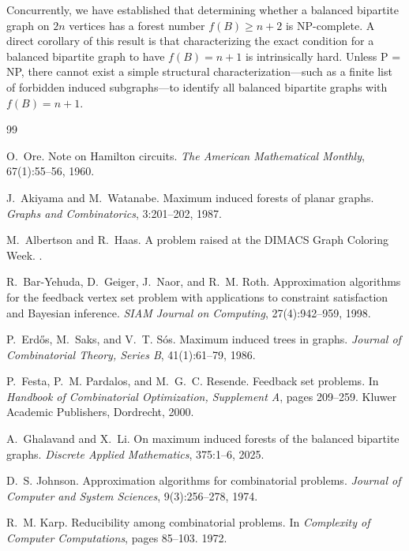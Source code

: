 \documentclass[a4paper]{amsart}
\begin{document}
Concurrently, we have established that determining whether a balanced bipartite graph on $2n$ vertices has a forest number $f(B) \ge n+2$ is NP-complete. 
A direct corollary of this result is that characterizing the exact condition for a balanced bipartite graph to have $f(B) = n+1$ is intrinsically hard. Unless P = NP, there cannot exist a simple structural characterization---such as a finite list of forbidden induced subgraphs---to identify all balanced bipartite graphs with $f(B) = n+1$.

\begin{thebibliography}{99}

O.~Ore.
\newblock Note on {H}amilton circuits.
\newblock \emph{The American Mathematical Monthly}, 67(1):55--56, 1960.

J.~Akiyama and M.~Watanabe.
\newblock Maximum induced forests of planar graphs.
\newblock \emph{Graphs and Combinatorics}, 3:201--202, 1987.

M.~Albertson and R.~Haas.
\newblock A problem raised at the {DIMACS} Graph Coloring Week.
.

R.~Bar-Yehuda, D.~Geiger, J.~Naor, and R.~M. Roth.
\newblock Approximation algorithms for the feedback vertex set problem with applications to constraint satisfaction and {B}ayesian inference.
\newblock \emph{SIAM Journal on Computing}, 27(4):942--959, 1998.

P.~Erd{\H{o}}s, M.~Saks, and V.~T. S{\'o}s.
\newblock Maximum induced trees in graphs.
\newblock \emph{Journal of Combinatorial Theory, Series B}, 41(1):61--79, 1986.

P.~Festa, P.~M. Pardalos, and M.~G.~C. Resende.
\newblock Feedback set problems.
\newblock In \emph{Handbook of Combinatorial Optimization, Supplement A}, pages 209--259. Kluwer Academic Publishers, Dordrecht, 2000.

A.~Ghalavand and X.~Li.
\newblock On maximum induced forests of the balanced bipartite graphs.
\newblock \emph{Discrete Applied Mathematics}, 375:1--6, 2025.

D.~S. Johnson.
\newblock Approximation algorithms for combinatorial problems.
\newblock \emph{Journal of Computer and System Sciences}, 9(3):256--278, 1974.

R.~M. Karp.
\newblock Reducibility among combinatorial problems.
\newblock In \emph{Complexity of Computer Computations}, pages 85--103. 1972.


\end{thebibliography}
\end{document}
